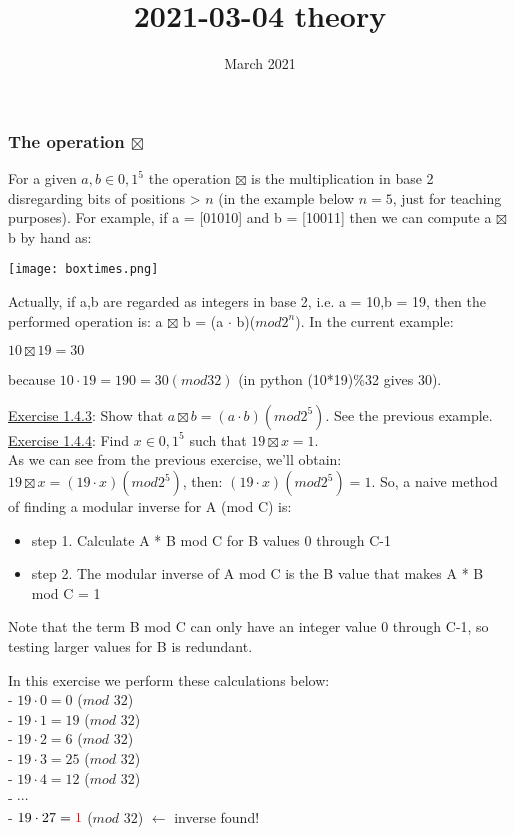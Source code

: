 \documentclass{article}
\title{2021-03-04 theory}
\author{}
\date{March 2021}
\begin{document}
\setcounter{section}{1}
\setcounter{subsection}{4}

\maketitle

\subsubsection{The operation $\boxtimes$}
For a given $a, b \in {0,1}^5$ the operation $\boxtimes$ is the multiplication in base 2 disregarding bits of positions > $n$ (in the example below $n = 5$, just for teaching purposes). For example, if a = [01010] and b = [10011] then we can compute a $\boxtimes$ b by hand as:

\begin{center}
\texttt{[image: boxtimes.png]}
\end{center}

Actually, if a,b are regarded as integers in base 2, i.e. a = 10,b = 19, then the performed operation is: a $\boxtimes$ b = (a $\cdot$ b)($mod 2^n$). In the current example:

\begin{center}
    $10 \boxtimes 19 = 30$
\end{center}

because $10 \cdot 19 = 190 = 30 (mod 32)$ (in python (10*19)\%32 gives 30).

\underline{Exercise 1.4.3}: Show that $a \boxtimes b = (a \cdot b)(mod 2^5)$. See the previous example.\\


\underline{Exercise 1.4.4}: Find $x \in {0,1}^5$ such that $19 \boxtimes x = 1$.\\
As we can see from the previous exercise, we'll obtain: $19 \boxtimes x = (19 \cdot x)(mod 2^5)$, then: $(19 \cdot x)(mod 2^5) = 1$. So, a naive method of finding a modular inverse for A (mod C) is:
\begin{itemize}
    \item step 1. Calculate A * B mod C for B values 0 through C-1
    \item step 2. The modular inverse of A mod C is the B value that makes A * B mod C = 1
\end{itemize}
Note that the term B mod C can only have an integer value 0 through C-1, so testing larger values for B is redundant.

In this exercise we perform these calculations below:\\
- $19 \cdot 0 = 0$ ($mod$ $32$)\\
- $19 \cdot 1 = 19$ ($mod$ $32$)\\
- $19 \cdot 2 = 6$ ($mod$ $32$)\\
- $19 \cdot 3 = 25$ ($mod$ $32$)\\
- $19 \cdot 4 = 12$ ($mod$ $32$)\\
-   $\cdots$ \\
- $19 \cdot 27 = \textcolor{red}{1}$ ($mod$ $32$) $\longleftarrow$ inverse found!\\
\end{document}
